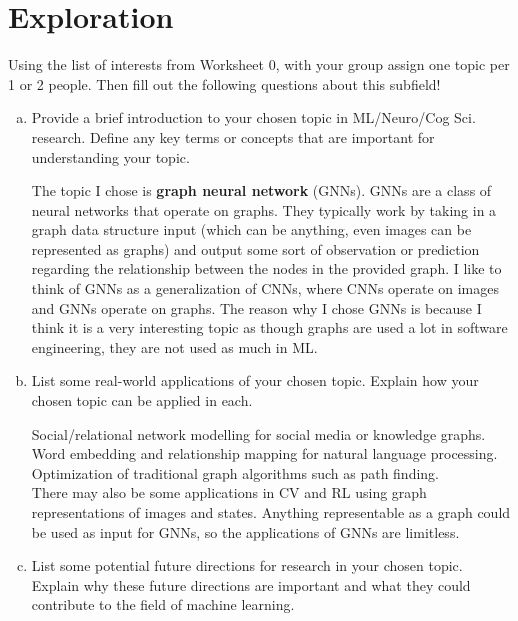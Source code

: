 \documentclass[letterpaper,11pt]{article}
\begin{document}
\section{Exploration}
Using the list of interests from Worksheet 0, with your group assign one topic per 1 or 2 people. Then fill out the following questions about this subfield!

\begin{enumerate}[a)]
\item
    Provide a brief introduction to your chosen topic in ML/Neuro/Cog Sci. research.
    Define any key terms or concepts that are important for understanding your topic.

\begin{tcolorbox}
    The topic I chose is \textbf{graph neural network} (GNNs). GNNs are a class of neural networks that
    operate on graphs. They typically work by taking in a graph data structure input (which can be anything,
    even images can be represented as graphs) and output some sort of observation or prediction regarding
    the relationship between the nodes in the provided graph. I like to think of GNNs as a generalization
    of CNNs, where CNNs operate on images and GNNs operate on graphs. The reason why I chose GNNs is
    because I think it is a very interesting topic as though graphs are used a lot in software engineering,
    they are not used as much in ML.
\end{tcolorbox}

\item     List some real-world applications of your chosen topic.
    Explain how your chosen topic can be applied in each.

\begin{tcolorbox}
    Social/relational network modelling for social media or knowledge graphs.\\
    Word embedding and relationship mapping for natural language processing.\\
    Optimization of traditional graph algorithms such as path finding.\\
    There may also be some applications in CV and RL using graph representations of images and states.
    Anything representable as a graph could be used as input for GNNs, so the applications of GNNs
    are limitless.
\end{tcolorbox}

\item    List some potential future directions for research in your chosen topic.
    Explain why these future directions are important and what they could contribute to the field of machine learning.


\end{enumerate}
\end{document}
